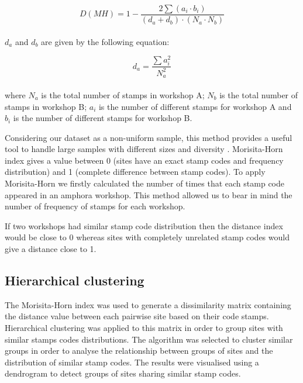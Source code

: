 \documentclass[review]{elsarticle}
\newcommand{\memo}[2]{\textcolor{#1}{#2}}
\newcommand{\xavi}[1]{\memo{magenta}{XRC: #1\\}}
\begin{document}
\begin{equation}
D(MH) = 1- \frac{2 \sum(a_{i} \cdot b_{i})}{(d_{a} + d_{b}) \cdot (N_{a} \cdot N_{b})}
\end{equation} \\

$d_{a}$ and $d_{b}$ are given by the following equation:

\begin{equation}
d_{a} = \frac{\sum a_{i}^{2}}{N_{a}^{2}} 
\end{equation} \\

where $N_{a}$ is the total number of stamps in workshop A; $N_{b}$ is the total number of stamps in workshop B; $a_{i}$ is the number of different stamps for workshop A and $b_{i}$ is the number of different stamps for workshop B.

Considering our dataset as a non-uniform sample, this method provides a useful tool to handle large samples with different sizes and diversity \citep{wolda_similarity_1981}. Morisita-Horn index gives a value between 0 (sites have an exact stamp codes and frequency distribution) and 1 (complete difference between stamp codes). To apply Morisita-Horn we firstly calculated the number of times that each stamp code appeared in an amphora workshop. 
This method allowed us to bear in mind the number of frequency of stamps for each workshop. 

If two workshops had similar stamp code distribution then the distance index would be close to 0 whereas sites with completely unrelated stamp codes would give a distance close to 1.

\subsection{Hierarchical clustering}

The Morisita-Horn index was used to generate a dissimilarity matrix containing the distance value between each pairwise site based on their code stamps. Hierarchical clustering was applied to this matrix in order to group sites with similar stamps codes distributions. The algorithm was selected to cluster similar groups in order to analyse the relationship between groups of sites and the distribution of similar stamp codes. The results were visualised using a dendrogram to detect groups of sites sharing similar stamp codes.  
\end{document}
